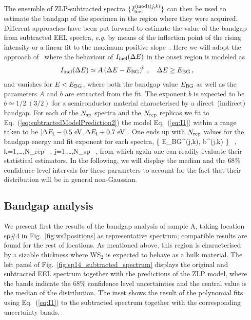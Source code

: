  The ensemble of ZLP-subtracted spectra $\{I_{\rm inel}^{({\rm mod})(j,k)} \} $
 can then be used to estimate the bandgap of the specimen in the region where
 they were acquired.
 Different approaches  have been put forward to estimate the value of the bandgap from 
subtracted EEL spectra, \textit{e.g.} by means of the inflection point of the rising intensity or
a linear fit to the maximum positive slope~\cite{Schamm:2003}.
%
Here we will adopt the approach of~\cite{Rafferty:2000} where the behaviour
of $I_{\rm inel}(\Delta E)$ in the onset region is modeled as
\begin{equation}
  \label{eq:I1}
    I_{\rm inel}(\Delta E) \simeq  A \left( \Delta E-E_{\rm BG} \right)^{b} \, , \quad \Delta E \ge E_{\rm BG} \, ,
\end{equation}
and vanishes for $E < E_{\rm BG}$, where both the bandgap value
$E_{\rm BG}$ as well as the parameters $A$ and $b$ are extracted from the fit.
%
The exponent $b$ is expected to be $b\simeq 1/2~(3/2)$ for a semiconductor material characterised
by a direct~(indirect) bandgap.
 For each of the $N_{\rm sp}$ spectra and the $N_{\rm rep}$ replicas
 we fit to Eq.~(\ref{eq:subtractedModelPrediction2}) the model Eq.~(\ref{eq:I1})
 within a range taken to be
 $\left[ \Delta E_{\rm I} - 0.5~{\rm eV}, \Delta E_{\rm I} + 0.7~{\rm eV}\right]$.
 One ends up with $N_{\rm rep}$ values for
 the bandgap energy and fit exponent for each spectra,
 \be
 \Big \{ E_{\rm BG}^{(j,k)}, b^{(j,k)} \Big\} \, , \quad k=1,\ldots,N_{\rm rep} \, ,
 \quad j=1,\ldots,N_{\rm sp} \, ,
 \ee
 from which again one can readily evaluate their statistical estimators.
 In the following, we will display the median and the 68\% confidence level intervals
 for these parameters to account for the fact that their distribution will be in general non-Gaussian.

 \subsection{Bandgap analysis}

We present first the results of the bandgap analysis of sample A,
taking location sp\#4 in Fig.~\ref{fig:ws2positions} as representative spectrum; compatible results
are found for the rest of locations.
%
As mentioned above, this region is characterised by a sizable thickness where
WS$_2$ is expected to behave as a bulk material.
%
The left panel of Fig.~\ref{fig:sp14_subtracted_spectrum} displays the original
and subtracted EEL spectrum
together with the predictions of the ZLP model, where
the bands indicate the 68\% confidence level uncertainties and the central value
is the median of the distribution.
%
The inset shows the result of the polynomial fits using Eq.~(\ref{eq:I1}) to the subtracted spectrum
together with the corresponding uncertainty bands.

